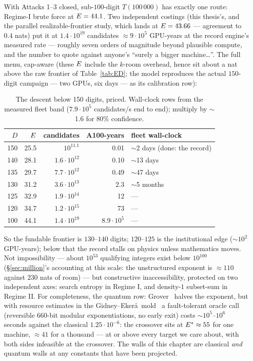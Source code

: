 With Attacks 1--3 closed, sub-$100$-digit $T(100\,000)$ has exactly one
route: Regime-I brute force at $E=44.1$. Two independent costings
(this thesis's, and the parallel realizable-frontier study, which
lands at $E=43.66$ --- agreement to $0.4$ nats) put it at
$1.4\cdot10^{19}$ candidates $\approx9\cdot10^5$ GPU-years at the
record engine's measured rate --- roughly seven orders of magnitude
beyond plausible compute, and the number to quote against anyone's
``surely a bigger machine\dots''. The full menu, cap-aware (these
$E$ include the $k$-room overhead, hence sit about a nat above the
raw frontier of Table~\ref{tab:ED}; the model reproduces the actual
$150$-digit campaign --- two GPUs, six days --- as its calibration row):

\begin{table}[h]
\centering\small
\caption{The descent below 150 digits, priced. Wall-clock rows from the
measured fleet band ($7.9\cdot10^5$ candidates/s end to end); multiply
by $\sim$1.6 for $80\%$ confidence.}\label{tab:menu}
\begin{tabular}{rrrrl}
\toprule
$D$ & $E$ & candidates & A100-years & fleet wall-clock\\
\midrule
150 & 25.5 & $10^{11.1}$ & 0.01 & $\sim$2 days (done: the record)\\
140 & 28.1 & $1.6\cdot10^{12}$ & 0.10 & $\sim$13 days\\
135 & 29.7 & $7.7\cdot10^{12}$ & 0.49 & $\sim$47 days\\
130 & 31.2 & $3.6\cdot10^{13}$ & 2.3 & $\sim$5 months\\
125 & 32.9 & $1.9\cdot10^{14}$ & 12 & ---\\
120 & 34.7 & $1.2\cdot10^{15}$ & 73 & ---\\
100 & 44.1 & $1.4\cdot10^{19}$ & $8.9\cdot10^5$ & ---\\
\bottomrule
\end{tabular}
\end{table}

So the fundable frontier is $130$--$140$ digits; $120$--$125$ is the
institutional edge ($\sim$$10^2$ GPU-years); below that the record
stalls on physics unless mathematics moves. Not impossibility ---
about $10^{53}$ qualifying integers exist below $10^{100}$
(\S\ref{sec:million}'s accounting at this scale: the unstructured
exponent is $\approx110$ against $230$ nats of room) --- but
constructive inaccessibility, protected on two independent axes:
search entropy in Regime I, and density-$1$ subset-sum in Regime II.
For completeness, the quantum row: Grover~\cite{Grover} halves the
exponent, but with resource estimates in the
Gidney--Eker\aa\ mold~\cite{GE} a fault-tolerant oracle call
(reversible $660$-bit modular exponentiations, no early exit) costs
$\sim$$10^5$--$10^6$ seconds against the classical
$1.25\cdot10^{-6}$: the crossover sits at $E^*\approx55$ for one
machine, $\approx41$ for a thousand --- at or above every target we
care about, with both sides infeasible at the crossover. The walls of
this chapter are classical \emph{and} quantum walls at any constants
that have been projected.

